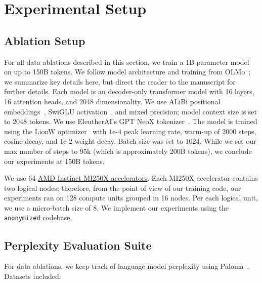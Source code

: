 \section{Experimental Setup}
\label{sec:setup}


\subsection{Ablation Setup}
\label{sec:setup:abl}

For all data ablations described in this section, we train a 1B parameter model on up to 150B tokens. 
We follow model architecture and training from OLMo~\citep{olmo20247b}; we summarize key details here, but direct the reader to the manuscript for further details.
Each model is an decoder-only transformer model with 16 layers, 16 attention heads, and 2048 dimensionality. 
We use ALiBi positional embeddings~\citep{Press2021Alibi}, SwiGLU activation~\citep{Shazeer2020swiglu}, and mixed precision; model context size is set to $2048$ tokens. 
We use EleutherAI's GPT NeoX tokenizer~\citep{Black2022GPTNeoX20BAO}.
The model is trained using the LionW optimizer~\citep{Chen2023Lion} with $1\text{e-}4$ peak learning rate, warm-up of $2000$ steps, cosine decay, and $1\text{e-}2$ weight decay. 
Batch size was set to $1024$.
While we set our max number of steps to 95k (which is approximately 200B tokens), we conclude our experiments at 150B tokens.

We use 64 \href{https://www.amd.com/en/products/server-accelerators/instinct-mi250x}{AMD Instinct MI250X accelerators}. Each MI250X accelerator contains two logical nodes; therefore, from the point of view of our training code, our experiments ran on 128 compute units grouped in 16 nodes. Per each logical unit, we use a micro-batch size of 8. 
We implement our experiments using the \texttt{anonymized} codebase.



\subsection{Perplexity Evaluation Suite}
\label{sec:setup:ppl}

For data ablations, we keep track of language model perplexity using Paloma~\citep{paloma}. Datasets included:

